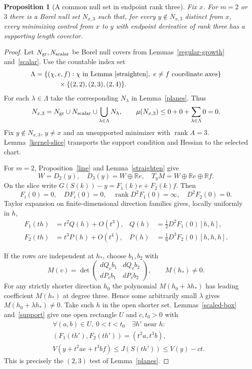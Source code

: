 \documentclass[11pt,letterpaper]{article}
\newtheorem{proposition}[theorem]{Proposition}
\newcommand{\R}{\mathbb R}
\newcommand{\rank}{\operatorname{rank}}
\begin{document}
\begin{proposition}[A common null set in endpoint rank three]\label{two-missing}
Fix $x$. For $m=2$ or $3$ there is a Borel null set $N_{x,3}$
such that, for every $y\notin N_{x,3}$ distinct from $x$, every minimizing
control from $x$ to $y$ with endpoint derivative of rank three has a
supporting length covector.
\end{proposition}
\begin{proof}
Let $N_{\rm gr},N_{\rm scalar}$ be Borel null covers from
Lemmas~\ref{regular-growth} and~\ref{scalar}. Use the countable index set
\[
 \begin{aligned}
 \Lambda&=\{(\chi,e,f):\chi\text{ in Lemma~\ref{straighten}},\
                  e\ne f\text{ coordinate axes}\}\\
         &\hspace{12mm}\times\{(2,2),(2,3),(2,4)\}.
 \end{aligned}
\]
For each $\lambda\in\Lambda$ take the corresponding $N_\lambda$ in
Lemma~\ref{planes}. Thus
\[
 N_{x,3}=N_{\rm gr}\cup N_{\rm scalar}\cup\bigcup_{\lambda\in\Lambda}N_\lambda,
 \qquad \mu(N_{x,3})\le0+0+\sum_{\lambda\in\Lambda}0=0 .
\]
Fix $y\notin N_{x,3}$, $y\ne x$ and an unsupported minimizer with $\rank A=3$.
Lemma~\ref{kernel-slice} transports the support condition and Hessian to
the selected chart.

For $m=2$, Proposition~\ref{line} and Lemma~\ref{straighten} give
\[
 W=D_2(y),\quad D_3(y)=W\oplus\R e,\quad T_yM=W\oplus\R e\oplus\R f .
\]
On the slice write $G(S(k))-y=F_1(k)e+F_2(k)f$. Then
\[
 F_i(0)=0,\quad DF_i(0)=0,\quad \rank D^2F_1(0)=\infty,\quad D^2F_2(0)=0 .
\]
Taylor expansion on finite-dimensional direction families gives, locally
uniformly in $h$,
\begin{equation}\label{jet-scales}
 \begin{aligned}
 F_1(th)&=t^2Q(h)+O(t^3), & Q(h)&=\tfrac12 D^2F_1(0)[h,h],\\
 F_2(th)&=t^3P(h)+O(t^4), & P(h)&=\tfrac16 D^3F_2(0)[h,h,h].
 \end{aligned}
\end{equation}

If the rows are independent at $h_*$, choose $b_1,b_2$ with
\[
 M(v)=\det
 \begin{pmatrix}dQ_v b_1&dQ_v b_2\\ dP_v b_1&dP_v b_2\end{pmatrix},
 \qquad M(h_*)\ne0 .
\]
For any strictly shorter direction $h_0$ the polynomial
$M(h_0+\lambda h_*)$ has leading coefficient $M(h_*)$ at degree three.
Hence some arbitrarily small $\lambda$ gives $M(h_0+\lambda h_*)\ne0$.
Take such $h$ in the open shorter set. Lemmas~\ref{scaled-box}
and~\ref{support} give one open rectangle $U$ and $c,t_0>0$ with
\[
 \begin{aligned}
 &\forall (a,b)\in U,\ 0<t<t_0\quad\exists h'\text{ near }h:\\
 &(F_1(th'),F_2(th'))=(t^2a,t^3b),\\
 &V(y+t^2ae+t^3bf)\le J(S(th'))\le V(y)-ct .
 \end{aligned}
\]
This is precisely the $(2,3)$ test of Lemma~\ref{planes}.


\end{proof}
\end{document}
